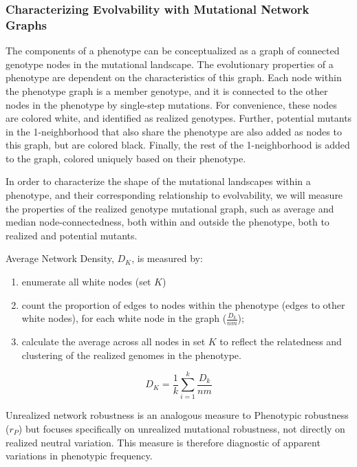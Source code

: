 \subsubsection{Characterizing Evolvability with Mutational Network Graphs}

The components of a phenotype can be conceptualized as a graph of connected genotype nodes in the mutational landscape. The evolutionary properties of a phenotype are dependent on the characteristics of this graph.  Each node within the phenotype graph is a member genotype, and it is connected to the other nodes in the phenotype by single-step mutations. For convenience, these nodes are colored white, and identified as realized genotypes. Further, potential mutants in the 1-neighborhood that also share the phenotype are also added as nodes to this graph, but are colored black. Finally, the rest of the 1-neighborhood is added to the graph, colored uniquely based on their phenotype. 

In order to characterize the shape of the mutational landscapes within a phenotype, and their corresponding relationship to evolvability, we will measure the properties of the realized genotype mutational graph, such as average and median node-connectedness, both within and outside the phenotype, both to realized and potential mutants. 

\begin{minipage}{\textwidth}

Average Network Density, $D_K$, is measured by:

\begin{enumerate}
\item enumerate all white nodes (set $K$)
\item count the proportion of edges to nodes within the phenotype (edges to other white nodes), for each white node in the graph ($\frac{D_k}{nm}$);
\item calculate the average across all nodes in set $K$ to reflect the relatedness and clustering of the realized genomes in the phenotype.
\end{enumerate}

\begin{equation}
D_{K} =  {\frac{1}{k} \sum_{i=1}^{k}}\frac{D_k}{nm} 
\end{equation}

\end{minipage}

Unrealized network robustness is an analogous measure to Phenotypic robustness ($r_P$) but focuses specifically on unrealized mutational robustness, not directly on realized neutral variation. This measure is therefore diagnostic of apparent variations in phenotypic frequency. 

